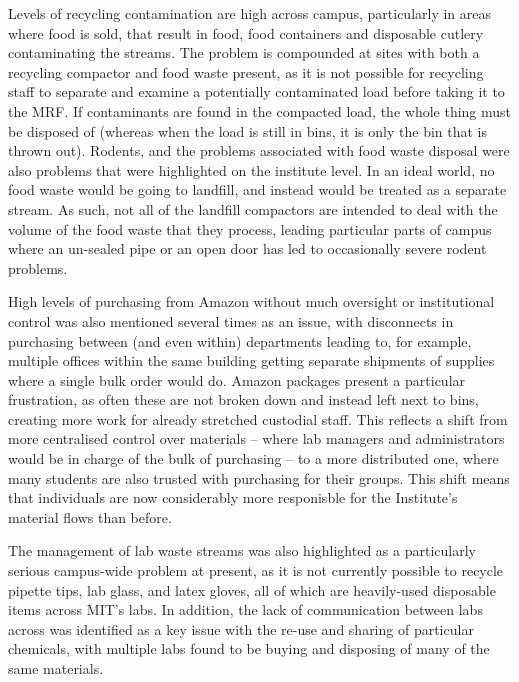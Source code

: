 \documentclass[nofonts,nols,justified,nobib]{tufte-book}
\begin{document}
Levels of recycling contamination are high across campus, particularly in areas where food is sold, that result in food, food containers and disposable cutlery contaminating the streams. The problem is compounded at sites with both a recycling compactor and food waste present, as it is not possible for recycling staff to separate and examine a potentially contaminated load before taking it to the MRF. If contaminants are found in the compacted load, the whole thing must be disposed of (whereas when the load is still in bins, it is only the bin that is thrown out). Rodents, and the problems associated with food waste disposal were also problems that were highlighted on the institute level. In an ideal world, no food waste would be going to landfill, and instead would be treated as a separate stream. As such, not all of the landfill compactors are intended to deal with the volume of the food waste that they process, leading particular parts of campus where an un-sealed pipe or an open door has led to occasionally severe rodent problems.

High levels of purchasing from Amazon without much oversight or institutional control was also mentioned several times as an issue, with disconnects in purchasing between (and even within) departments leading to, for example, multiple offices within the same building getting separate shipments of supplies where a single bulk order would do. Amazon packages present a particular frustration, as often these are not broken down and instead left next to bins, creating more work for already stretched custodial staff. This reflects a shift from more centralised control over materials -- where lab managers and administrators would be in charge of the bulk of purchasing -- to a more distributed one, where many students are also trusted with purchasing for their groups. This shift means that individuals are now considerably more responisble for the Institute's material flows than before.


The management of lab waste streams was also highlighted as a particularly serious campus-wide problem at present, as it is not currently possible to recycle pipette tips, lab glass, and latex gloves, all of which are heavily-used disposable items across MIT's labs. In addition, the lack of communication between labs across was identified as a key issue with the re-use and sharing of particular chemicals, with multiple labs found to be buying and disposing of many of the same materials. 
\end{document}
